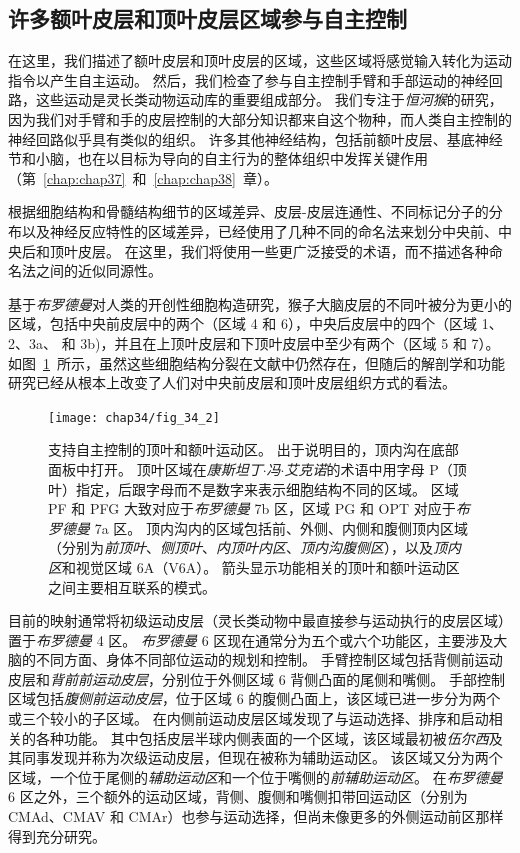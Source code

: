 \subsection{许多额叶皮层和顶叶皮层区域参与自主控制}

在这里，我们描述了额叶皮层和顶叶皮层的区域，这些区域将感觉输入转化为运动指令以产生自主运动。
然后，我们检查了参与自主控制手臂和手部运动的神经回路，这些运动是灵长类动物运动库的重要组成部分。
我们专注于\textit{恒河猴}的研究，因为我们对手臂和手的皮层控制的大部分知识都来自这个物种，而人类自主控制的神经回路似乎具有类似的组织。
许多其他神经结构，包括前额叶皮层、基底神经节和小脑，也在以目标为导向的自主行为的整体组织中发挥关键作用（第~\ref{chap:chap37}~和~\ref{chap:chap38}~章）。


根据细胞结构和骨髓结构细节的区域差异、皮层-皮层连通性、不同标记分子的分布以及神经反应特性的区域差异，已经使用了几种不同的命名法来划分中央前、中央后和顶叶皮层。
在这里，我们将使用一些更广泛接受的术语，而不描述各种命名法之间的近似同源性。


基于\textit{布罗德曼}对人类的开创性细胞构造研究，猴子大脑皮层的不同叶被分为更小的区域，包括中央前皮层中的两个（区域 4 和 6），中央后皮层中的四个（区域 1、2、3a、 和 3b)，并且在上顶叶皮层和下顶叶皮层中至少有两个（区域 5 和 7）。
如图~\ref{fig:34_2}~所示，虽然这些细胞结构分裂在文献中仍然存在，但随后的解剖学和功能研究已经从根本上改变了人们对中央前皮层和顶叶皮层组织方式的看法。


\begin{figure}[htbp]
	\centering
	\texttt{[image: chap34/fig\_34\_2]}
	\caption{支持自主控制的顶叶和额叶运动区。
		出于说明目的，顶内沟在底部面板中打开。
		顶叶区域在\textit{康斯坦丁$\cdot$冯$\cdot$艾克诺}的术语中用字母 P（顶叶）指定，后跟字母而不是数字来表示细胞结构不同的区域。
		区域 PF 和 PFG 大致对应于\textit{布罗德曼} 7b 区，区域 PG 和 OPT 对应于\textit{布罗德曼} 7a 区。
		顶内沟内的区域包括前、外侧、内侧和腹侧顶内区域（分别为\textit{前顶叶}、\textit{侧顶叶}、\textit{内顶叶内区}、\textit{顶内沟腹侧区}），以及\textit{顶内区}和视觉区域 6A（V6A）。
		箭头显示功能相关的顶叶和额叶运动区之间主要相互联系的模式。}
	\label{fig:34_2}
\end{figure}


目前的映射通常将初级运动皮层（灵长类动物中最直接参与运动执行的皮层区域）置于\textit{布罗德曼} 4 区。
\textit{布罗德曼} 6 区现在通常分为五个或六个功能区，主要涉及大脑的不同方面、身体不同部位运动的规划和控制。
手臂控制区域包括背侧前运动皮层和\textit{背前前运动皮层}，分别位于外侧区域 6 背侧凸面的尾侧和嘴侧。
手部控制区域包括\textit{腹侧前运动皮层}，位于区域 6 的腹侧凸面上，该区域已进一步分为两个或三个较小的子区域。
在内侧前运动皮层区域发现了与运动选择、排序和启动相关的各种功能。
其中包括皮层半球内侧表面的一个区域，该区域最初被\textit{伍尔西}及其同事发现并称为次级运动皮层，但现在被称为辅助运动区。
该区域又分为两个区域，一个位于尾侧的\textit{辅助运动区}和一个位于嘴侧的\textit{前辅助运动区}。
在\textit{布罗德曼} 6 区之外，三个额外的运动区域，背侧、腹侧和嘴侧扣带回运动区（分别为 CMAd、CMAV 和 CMAr）也参与运动选择，但尚未像更多的外侧运动前区那样得到充分研究。


